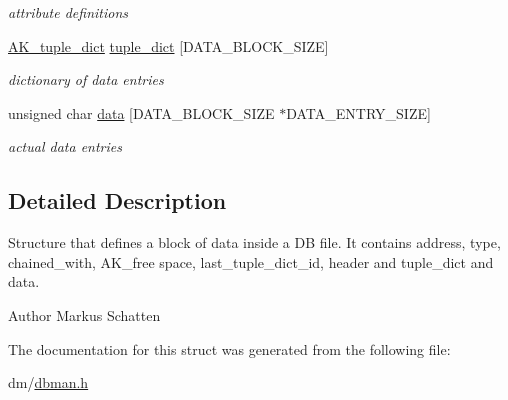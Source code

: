\begin{DoxyCompactItemize}
\begin{DoxyCompactList}\small\item\em attribute definitions \end{DoxyCompactList}\item 
\hyperlink{structAK__tuple__dict}{A\+K\+\_\+tuple\+\_\+dict} \hyperlink{structAK__block_ad5eaa0ebdbeee5d5083d185c8b9ac3b4}{tuple\+\_\+dict} \mbox{[}D\+A\+T\+A\+\_\+\+B\+L\+O\+C\+K\+\_\+\+S\+I\+ZE\mbox{]}\hypertarget{structAK__block_ad5eaa0ebdbeee5d5083d185c8b9ac3b4}{}\label{structAK__block_ad5eaa0ebdbeee5d5083d185c8b9ac3b4}

\begin{DoxyCompactList}\small\item\em dictionary of data entries \end{DoxyCompactList}\item 
unsigned char \hyperlink{structAK__block_af66ba2bcc5d90ff18f09982975efb913}{data} \mbox{[}D\+A\+T\+A\+\_\+\+B\+L\+O\+C\+K\+\_\+\+S\+I\+ZE $\ast$D\+A\+T\+A\+\_\+\+E\+N\+T\+R\+Y\+\_\+\+S\+I\+ZE\mbox{]}\hypertarget{structAK__block_af66ba2bcc5d90ff18f09982975efb913}{}\label{structAK__block_af66ba2bcc5d90ff18f09982975efb913}

\begin{DoxyCompactList}\small\item\em actual data entries \end{DoxyCompactList}\end{DoxyCompactItemize}


\subsection{Detailed Description}
Structure that defines a block of data inside a DB file. It contains address, type, chained\+\_\+with, A\+K\+\_\+free space, last\+\_\+tuple\+\_\+dict\+\_\+id, header and tuple\+\_\+dict and data. 

\begin{DoxyAuthor}{Author}
Markus Schatten 
\end{DoxyAuthor}


The documentation for this struct was generated from the following file\+:\begin{DoxyCompactItemize}
\item 
dm/\hyperlink{dbman_8h}{dbman.\+h}\end{DoxyCompactItemize}
